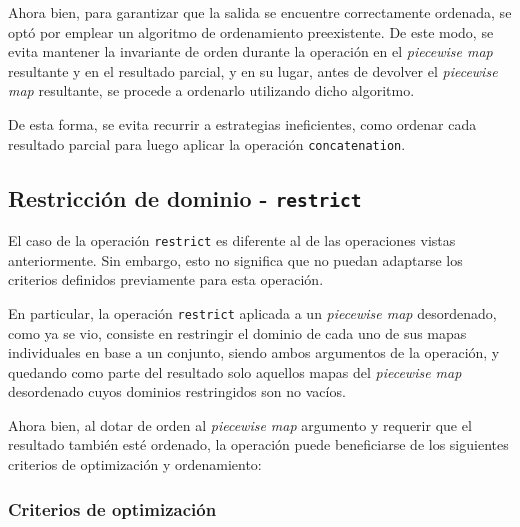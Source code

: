 Ahora bien, para garantizar que la salida se encuentre correctamente ordenada, se optó por emplear un algoritmo de ordenamiento preexistente. De este modo, se evita mantener la invariante de orden durante la operación en el \textit{piecewise map} resultante y en el resultado parcial, y en su lugar, antes de devolver el \textit{piecewise map} resultante, se procede a ordenarlo utilizando dicho algoritmo.

De esta forma, se evita recurrir a estrategias ineficientes, como ordenar cada resultado parcial para luego aplicar la operación \texttt{concatenation}.

\subsection{Restricción de dominio - \texttt{restrict}}

El caso de la operación \texttt{restrict} es diferente al de las operaciones vistas anteriormente. Sin embargo, esto no significa que no puedan adaptarse los criterios definidos previamente para esta operación.

En particular, la operación \texttt{restrict} aplicada a un \textit{piecewise map} desordenado, como ya se vio, consiste en restringir el dominio de cada uno de sus mapas individuales en base a un conjunto, siendo ambos argumentos de la operación, y quedando como parte del resultado solo aquellos mapas del \textit{piecewise map} desordenado cuyos dominios restringidos son no vacíos.

Ahora bien, al dotar de orden al \textit{piecewise map} argumento y requerir que el resultado también esté ordenado, la operación puede beneficiarse de los siguientes criterios de optimización y ordenamiento:

\subsubsection{Criterios de optimización}


